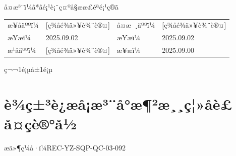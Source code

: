 \documentclass[UTF8,10pt,a4paper,fontset=fandol]{ctexart}
\newcommand{\fieldvalue}[1]{#1}
\newcommand{\handwritten}[1]{#1}
\begin{document}
å¤æ³¨ï¼â*âé¡¹è¡¨ç¤ºå§ææ£éªé¡¹ç®ã

\vspace{1.2cm}

\begin{tabularx}{\textwidth}{@{}p{}X p{}X@{}}
æ¥åäººï¼&
\fieldvalue{\handwritten{[ç­¾åé¾ä»¥è¾¨è®¤]}}
&
å¤æ ¸äººï¼&
\fieldvalue{\handwritten{[ç­¾åé¾ä»¥è¾¨è®¤]}}
\\[0.8cm]
æ¥\quad æï¼&
\fieldvalue{\handwritten{2025.09.02}}
&
æ¥\quad æï¼&
\fieldvalue{\handwritten{2025.09.02}}
\\[1.0cm]
æ¹åäººï¼&
\fieldvalue{\handwritten{[ç­¾åé¾ä»¥è¾¨è®¤]}}
&
æ¥\quad æï¼&
\fieldvalue{\handwritten{2025.09.00}}
\end{tabularx}

\vfill
\begin{center}
ç¬¬1é¡µ\quad å±1é¡µ
\end{center}

\newpage

\section*{è¾ç±³è¿æå¡æ³¨å°æ¶²æ¸¸ç¦»åè£å¤çè®°å½}

\noindent
æä»¶ç¼å·ï¼REC-YZ-SQP-QC-03-092
\end{document}
